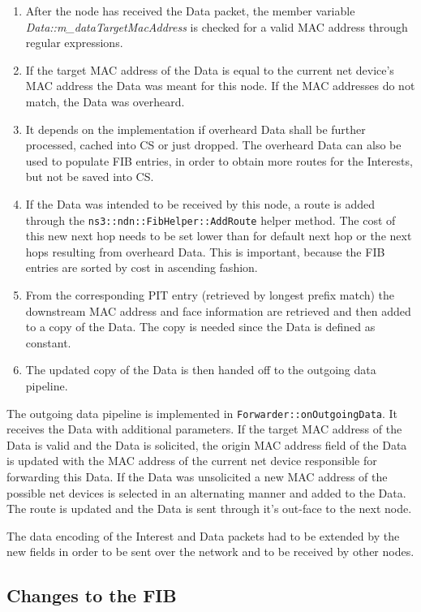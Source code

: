 \begin{enumerate}
\item After the node has received the Data packet, the member variable  \emph{Data::m\_dataTargetMacAddress} is checked for a valid MAC address through regular expressions.
\item If the target MAC address of the Data is equal to the current net device's MAC address the Data was meant for this node. If the MAC addresses do not match, the Data was overheard.
\item It depends on the implementation if overheard Data shall be further processed, cached into CS or just dropped. The overheard Data can also be used to populate FIB entries, in order to obtain more routes for the Interests, but not be saved into CS.
\item If the Data was intended to be received by this node, a route is added through the \texttt{ns3::ndn::FibHelper::AddRoute} helper method. The cost of this new next hop needs to be set lower than for default next hop or the next hops resulting from overheard Data. This is important, because the FIB entries are sorted by cost in ascending fashion.
\item From the corresponding PIT entry (retrieved by longest prefix match) the downstream MAC address and face information are retrieved and then added to a copy of the Data. The copy is needed since the Data is defined as constant.
\item The updated copy of the Data is then handed off to the outgoing data pipeline.
\end{enumerate}

The outgoing data pipeline is implemented in \texttt{Forwarder::onOutgoingData}. It receives the Data with additional parameters. If the target MAC address of the Data is valid and the Data is solicited, the origin MAC address field of the Data is updated with the MAC address of the current net device responsible for forwarding this Data. If the Data was unsolicited a new MAC address of the possible net devices is selected in an alternating manner and added to the Data. The route is updated and the Data is sent through it's out-face to the next node.

The data encoding of the Interest and Data packets had to be extended by the new fields in order to be sent over the network and to be received by other nodes.

\subsection{Changes to the FIB}


